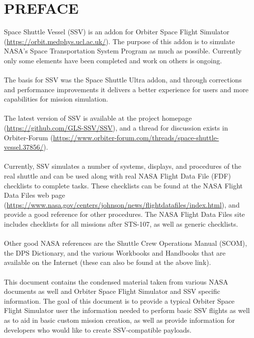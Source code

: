 \documentclass[Space_Shuttle_Vessel_Manual.tex]{subfiles}
\begin{document}
\section*{PREFACE}
\begin{multicols*}{2}
Space Shuttle Vessel (SSV) is an addon for Orbiter Space Flight Simulator (\url{https://orbit.medphys.ucl.ac.uk/}). The purpose of this addon is to simulate NASA's Space Transportation System Program as much as possible. Currently only some elements have been completed and work on others is ongoing.\\
\\
The basis for SSV was the Space Shuttle Ultra addon, and through corrections and performance improvements it delivers a better experience for users and more capabilities for mission simulation.\\
\\
The latest version of SSV is available at the project homepage (\url{https://github.com/GLS-SSV/SSV}), and a thread for discussion exists in Orbiter-Forum (\url{https://www.orbiter-forum.com/threads/space-shuttle-vessel.37856/}).\\
\\
Currently, SSV simulates a number of systems, displays, and procedures of the real shuttle and can be used along with real NASA Flight Data File (FDF) checklists to complete tasks. These checklists can be found at the NASA Flight Data Files web page (\url{https://www.nasa.gov/centers/johnson/news/flightdatafiles/index.html}), and provide a good reference for other procedures. The NASA Flight Data Files site includes checklists for all missions after STS-107, as well as generic checklists.\\
\\
Other good NASA references are the Shuttle Crew Operations Manual (SCOM), the DPS Dictionary, and the various Workbooks and Handbooks that are available on the Internet (these can also be found at the above link).\\
\\
This document contains the condensed material taken from various NASA documents as well and Orbiter Space Flight Simulator and SSV specific information. The goal of this document is to provide a typical Orbiter Space Flight Simulator user the information needed to perform basic SSV flights as well as  to aid in basic custom mission creation, as well as provide information for developers who would like to create SSV-compatible payloads.\\

\end{multicols*}
\end{document}
